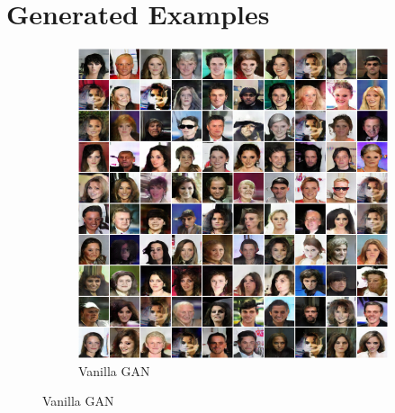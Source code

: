 \documentclass[table]{article}
\begin{document}
\section{Generated Examples}
\begin{figure}[ht]
  \centering
  \begin{subfigure}{\textwidth}
    \centering
    \includegraphics[scale=0.38]{imgs/gan_epoch50}
    \caption{Vanilla GAN}
  \end{subfigure}


\end{figure}
\end{document}
